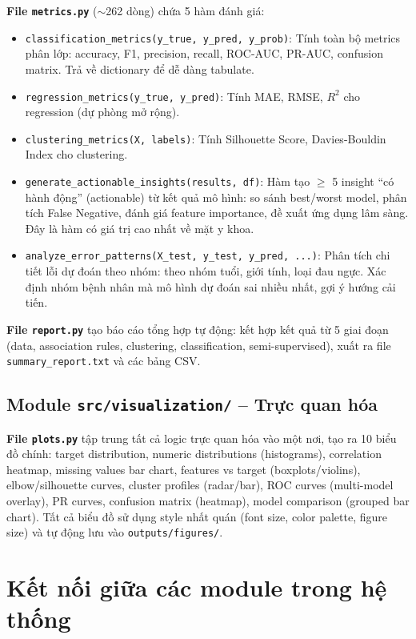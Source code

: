 \textbf{File \texttt{metrics.py}} ($\sim$262 dòng) chứa 5 hàm đánh giá:
\begin{itemize}
    \item \texttt{classification\_metrics(y\_true, y\_pred, y\_prob)}: Tính toàn bộ metrics phân lớp: accuracy, F1, precision, recall, ROC-AUC, PR-AUC, confusion matrix. Trả về dictionary để dễ dàng tabulate.
    \item \texttt{regression\_metrics(y\_true, y\_pred)}: Tính MAE, RMSE, $R^2$ cho regression (dự phòng mở rộng).
    \item \texttt{clustering\_metrics(X, labels)}: Tính Silhouette Score, Davies-Bouldin Index cho clustering.
    \item \texttt{generate\_actionable\_insights(results, df)}: Hàm tạo $\geq$ 5 insight ``có hành động'' (actionable) từ kết quả mô hình: so sánh best/worst model, phân tích False Negative, đánh giá feature importance, đề xuất ứng dụng lâm sàng. Đây là hàm có giá trị cao nhất về mặt y khoa.
    \item \texttt{analyze\_error\_patterns(X\_test, y\_test, y\_pred, ...)}: Phân tích chi tiết lỗi dự đoán theo nhóm: theo nhóm tuổi, giới tính, loại đau ngực. Xác định nhóm bệnh nhân mà mô hình dự đoán sai nhiều nhất, gợi ý hướng cải tiến.
\end{itemize}

\textbf{File \texttt{report.py}} tạo báo cáo tổng hợp tự động: kết hợp kết quả từ 5 giai đoạn (data, association rules, clustering, classification, semi-supervised), xuất ra file \texttt{summary\_report.txt} và các bảng CSV.

\subsection{Module \texttt{src/visualization/} -- Trực quan hóa}

\textbf{File \texttt{plots.py}} tập trung tất cả logic trực quan hóa vào một nơi, tạo ra 10 biểu đồ chính: target distribution, numeric distributions (histograms), correlation heatmap, missing values bar chart, features vs target (boxplots/violins), elbow/silhouette curves, cluster profiles (radar/bar), ROC curves (multi-model overlay), PR curves, confusion matrix (heatmap), model comparison (grouped bar chart). Tất cả biểu đồ sử dụng style nhất quán (font size, color palette, figure size) và tự động lưu vào \texttt{outputs/figures/}.

\section{Kết nối giữa các module trong hệ thống}

